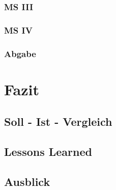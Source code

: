 \documentclass{article}
\begin{document}
\subsubsection{MS III}

\vspace{1cm}
\subsubsection{MS IV}

\vspace{1cm}
\subsubsection{Abgabe}

\newpage
\section{Fazit}

\vspace{2cm}
\subsection{Soll - Ist - Vergleich}

\vspace{2cm}
\subsection{Lessons Learned}

\vspace{2cm}
\subsection{Ausblick}
	
\end{document}
